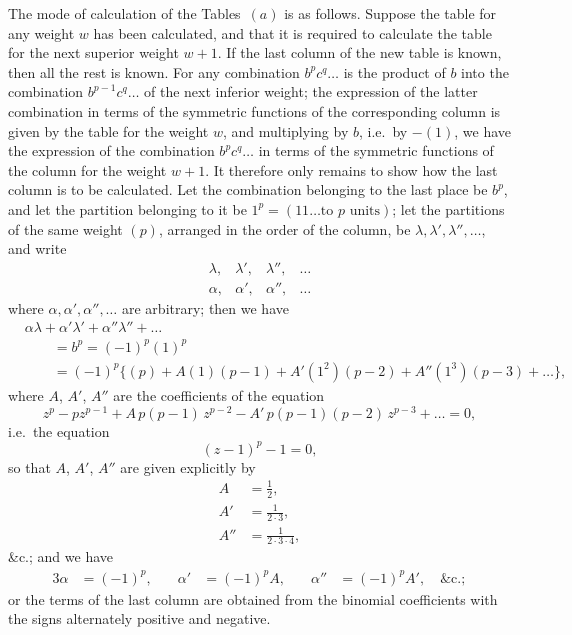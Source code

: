 \documentclass[11pt,a4paper]{book}
\begin{document}
\begin{center}
The mode of calculation of the Tables~$(a)$ is as follows. Suppose the table
for any weight $w$ has been calculated, and that it is required to calculate
the table for the next superior weight $w + 1$. If the last column of the new
table is known, then all the rest is known. For any combination
$b^p c^q \ldots$ is the product of $b$ into the combination $b^{p-1} c^q \ldots$
of the next inferior weight; the expression of the latter combination in terms
of the symmetric functions of the corresponding column is given by the table
for the weight $w$, and multiplying by $b$, i.e.\ by $-(1)$, we have the
expression of the combination $b^p c^q \ldots$ in terms of the symmetric
functions of the column for the weight $w + 1$. It therefore only remains to
show how the last column is to be calculated. Let the combination belonging to
the last place be $b^p$, and let the partition belonging to it be
$1^p = (11 \ldots \text{to } p \text{ units})$; let the partitions of the same
weight $(p)$, arranged in the order of the column, be
$\lambda, \lambda', \lambda'', \ldots$, and write
\[\begin{array}{ccccc}
\lambda, & \lambda', & \lambda'', & \ldots \\
\alpha, & \alpha', & \alpha'', & \ldots
\end{array}\]
where $\alpha, \alpha', \alpha'', \ldots$ are arbitrary; then we have
\begin{align*}
& \alpha\lambda + \alpha'\lambda' + \alpha''\lambda'' + \ldots \\
&\qquad = b^p = (-1)^p (1)^p \\
&\qquad = (-1)^p \{(p) + A(1)(p-1) + A'(1^2)(p-2) + A''(1^3)(p-3) + \ldots\},
\end{align*}
where $A$, $A'$, $A''$ are the coefficients of the equation
\[
z^p - pz^{p-1} + A\, p(p-1)\, z^{p-2} - A'\, p(p-1)(p-2)\, z^{p-3} + \ldots = 0,
\]
i.e.\ the equation
\[
(z - 1)^p - 1 = 0,
\]
so that $A$, $A'$, $A''$ are given explicitly by
\begin{align*}
A &= \frac{1}{2}, \\
A' &= \frac{1}{2\cdot 3}, \\
A'' &= \frac{1}{2\cdot 3\cdot 4},
\end{align*}
\&c.; and we have
\begin{alignat*}{3}
\alpha &= (-1)^p, &\quad \alpha' &= (-1)^p A, &\quad \alpha'' &= (-1)^p A', \quad \&\text{c.};
\end{alignat*}
or the terms of the last column are obtained from the binomial coefficients
with the signs alternately positive and negative.


\end{center}
\end{document}
